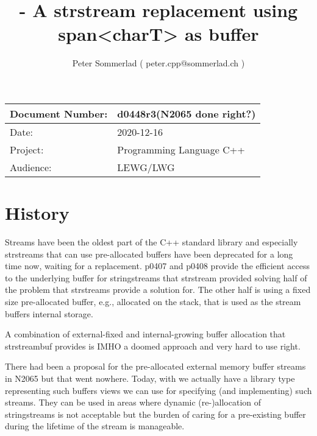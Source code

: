 \documentclass[ebook,11pt,article]{memoir}
\title{\papernumber{} - A strstream replacement using span\textless{}charT\textgreater{} as buffer}
\author{Peter Sommerlad 
( peter.cpp@sommerlad.ch )}
\date{\paperdate}                %
\newcommand{\papernumber}{d0448r3}
\newcommand{\paperdate}{2020-12-16}
\begin{document}
\maketitle
\begin{center}
\begin{tabular}[t]{|l|l|}\hline 
Document Number:&  \papernumber \hfill (N2065 done right?)\\\hline
Date: & \paperdate \\\hline
Project: & Programming Language C++\\\hline 
Audience: & LEWG/LWG\\\hline
\end{tabular}
\end{center}
\chapter{History}
Streams have been the oldest part of the C++ standard library and especially strstreams that can use pre-allocated buffers have been deprecated for a long time now, waiting for a replacement. p0407 and p0408 provide the efficient access to the underlying buffer for stringstreams that strstream provided solving half of the problem that strstreams provide a solution for. The other half is using a fixed size pre-allocated buffer, e.g., allocated on the stack, that is used as the stream buffers internal storage.

A combination of external-fixed and internal-growing buffer allocation that strstreambuf provides is IMHO a doomed approach and very hard to use right.

There had been a proposal for the pre-allocated external memory buffer streams in N2065 but that went nowhere. Today, with  we actually have a library type representing such buffers views we can use for specifying (and implementing) such streams. They can be used in areas where dynamic (re-)allocation of stringstreams is not acceptable but the burden of caring for a pre-existing buffer during the lifetime of the stream is manageable. 
\end{document}

